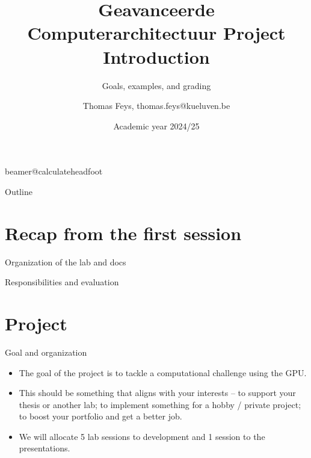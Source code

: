\documentclass[11pt,t]{beamer}
\title[Geavanceerde Computerarchitectuur Project Introduction]{Geavanceerde Computerarchitectuur Project Introduction} %
\subtitle{Goals, examples, and grading}
\author{Thomas Feys, {\footnotesize thomas.feys@kueluven.be}}
\institute{DRAMCO -- WaveCore -- ESAT}
\date{Academic year 2024/25}
\begin{document}
\csname beamer@calculateheadfoot\endcsname %


\begin{frame}
	\titlepage
\end{frame}
	

\begin{frame}{Outline}
	\hfill	{\large \parbox{.961\textwidth}{\tableofcontents[hideothersubsections]}}
\end{frame}







\section{Recap from the first session}

\begin{frame}{Organization of the lab and docs} 
    \begin{figure}[t]
        \centering
        \begin{center}               
            \resizebox{0.98\columnwidth}{!}{}
        \end{center}
    \end{figure}
\end{frame}

\begin{frame}{Responsibilities and evaluation} 
    \begin{figure}[t]
        \centering
        \begin{center}               
            \resizebox{0.98\columnwidth}{!}{}
        \end{center}
    \end{figure}
\end{frame}


\section{Project}


\begin{frame}{Goal and organization} 

\begin{itemize}\setlength\itemsep{0.5em}
\item The goal of the project is to tackle a computational challenge using the GPU.
\item This should be something that aligns with your interests -- to support your thesis or another lab; to implement something for a hobby / private project; to boost your portfolio and get a better job.
\item We will allocate 5 lab sessions to development and 1 session to the presentations.
\end{itemize}

\end{frame}
\end{document}
